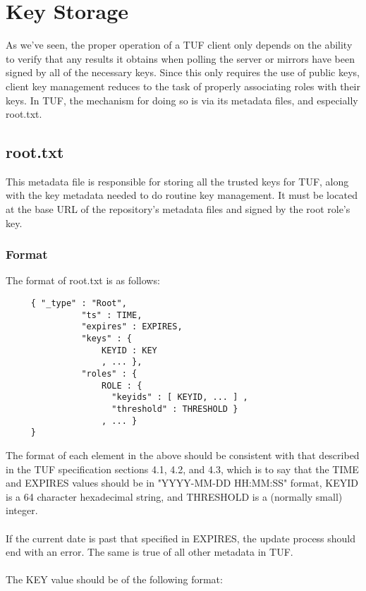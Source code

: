 \documentclass{letter}
\begin{document}
\section{Key Storage}
As we've seen, the proper operation of a TUF client only depends on the ability to 
verify that any results it obtains when polling the server or mirrors have been 
signed by all of the necessary keys. Since this only requires the use of public 
keys, client key management reduces to the task of properly associating roles 
with their keys. In TUF, the mechanism for doing so is via its metadata files, and
especially root.txt.

\subsection{root.txt}
This metadata file is responsible for storing all the trusted keys for TUF, 
along with the key metadata needed to do routine key management. It must be 
located at the base URL of the repository's metadata files and signed by the 
root role's key.

\subsubsection{Format}
The format of root.txt is as follows:

\begin{verbatim}
     { "_type" : "Root",
               "ts" : TIME,
               "expires" : EXPIRES,
               "keys" : {
                   KEYID : KEY
                   , ... },
               "roles" : {
                   ROLE : {
                     "keyids" : [ KEYID, ... ] ,
                     "threshold" : THRESHOLD }
                   , ... }
     }
\end{verbatim}

The format of each element in the above should be consistent with that described
in the TUF specification sections 4.1, 4.2, and 4.3, which is to say that the
TIME and EXPIRES values should be in "YYYY-MM-DD HH:MM:SS" format, KEYID is a
64 character hexadecimal string, and THRESHOLD is a (normally small) integer.
\\\\
If the current date is past that specified in EXPIRES, the update process should
end with an error. The same is true of all other metadata in TUF.
\\\\
The KEY value should be of the following format:
\end{document}
